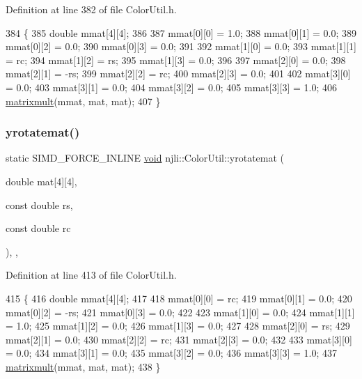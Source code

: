 Definition at line 382 of file Color\+Util.\+h.


\begin{DoxyCode}
384     \{
385       \textcolor{keywordtype}{double} mmat[4][4];
386 
387       mmat[0][0] = 1.0;
388       mmat[0][1] = 0.0;
389       mmat[0][2] = 0.0;
390       mmat[0][3] = 0.0;
391 
392       mmat[1][0] = 0.0;
393       mmat[1][1] = rc;
394       mmat[1][2] = rs;
395       mmat[1][3] = 0.0;
396 
397       mmat[2][0] = 0.0;
398       mmat[2][1] = -rs;
399       mmat[2][2] = rc;
400       mmat[2][3] = 0.0;
401 
402       mmat[3][0] = 0.0;
403       mmat[3][1] = 0.0;
404       mmat[3][2] = 0.0;
405       mmat[3][3] = 1.0;
406       \mbox{\hyperlink{classnjli_1_1_color_util_a5cb3576c8177f303c88dc4e7283367c7}{matrixmult}}(mmat, mat, mat);
407     \}
\end{DoxyCode}
\mbox{\label{classnjli_1_1_color_util_ac37c7eb0af14d9171809c8a1cab9a834}} 
\subsubsection{\texorpdfstring{yrotatemat()}{yrotatemat()}}
{\footnotesize\ttfamily static S\+I\+M\+D\+\_\+\+F\+O\+R\+C\+E\+\_\+\+I\+N\+L\+I\+NE \mbox{\hyperlink{_thread_8h_af1e856da2e658414cb2456cb6f7ebc66}{void}} njli\+::\+Color\+Util\+::yrotatemat (\begin{DoxyParamCaption}\item[{double}]{mat\mbox{[}4\mbox{]}\mbox{[}4\mbox{]},  }\item[{const double}]{rs,  }\item[{const double}]{rc }\end{DoxyParamCaption})\hspace{0.3cm}{\ttfamily [inline]}, {\ttfamily [static]}, {\ttfamily [protected]}}



Definition at line 413 of file Color\+Util.\+h.


\begin{DoxyCode}
415     \{
416       \textcolor{keywordtype}{double} mmat[4][4];
417 
418       mmat[0][0] = rc;
419       mmat[0][1] = 0.0;
420       mmat[0][2] = -rs;
421       mmat[0][3] = 0.0;
422 
423       mmat[1][0] = 0.0;
424       mmat[1][1] = 1.0;
425       mmat[1][2] = 0.0;
426       mmat[1][3] = 0.0;
427 
428       mmat[2][0] = rs;
429       mmat[2][1] = 0.0;
430       mmat[2][2] = rc;
431       mmat[2][3] = 0.0;
432 
433       mmat[3][0] = 0.0;
434       mmat[3][1] = 0.0;
435       mmat[3][2] = 0.0;
436       mmat[3][3] = 1.0;
437       \mbox{\hyperlink{classnjli_1_1_color_util_a5cb3576c8177f303c88dc4e7283367c7}{matrixmult}}(mmat, mat, mat);
438     \}
\end{DoxyCode}
\mbox{\label{classnjli_1_1_color_util_ab43ec520ddd37266b3fb9a2e4f4a4ec3}} 
